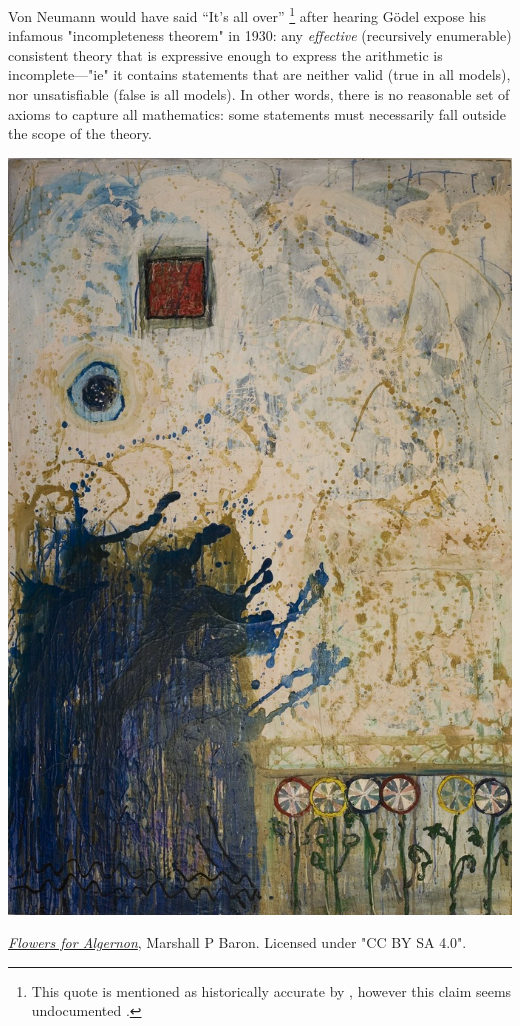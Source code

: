 Von Neumann would have said ``It's all over''%
\footnote{This quote is mentioned as historically accurate by
\cite{2009Logicomix}, however this claim seems undocumented \cite{Mancosu2011Logicomix}.}
after hearing Gödel expose his infamous "incompleteness theorem" in 1930:
any \emph{effective} (recursively enumerable)
consistent theory that is expressive enough to express the arithmetic
is incomplete---"ie" it contains statements that are neither valid (true in all models),
nor unsatisfiable (false is all models).
In other words, there is no reasonable set of axioms
to capture all mathematics: some statements must necessarily fall outside
the scope of the theory.
\begin{marginfigure}[-55em]
	\centering
	\includegraphics[width=\linewidth]{fig/Flowers_for_Algernon.jpg}
	\caption{\emph{\href{https://commons.wikimedia.org/wiki/File:Flowers_for_Algernon.jpg}{Flowers for Algernon}}, Marshall P Baron.
	Licensed under "CC BY SA 4.0".}
\end{marginfigure}

